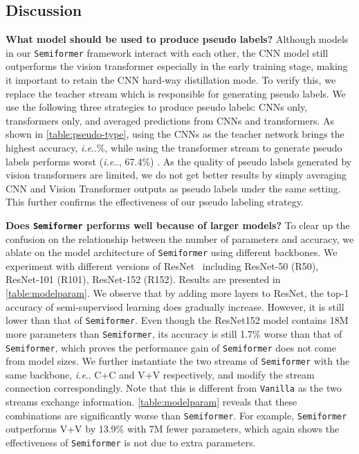 \documentclass[runningheads]{llncs}
\makeatletter
\DeclareRobustCommand\onedot{\futurelet\@let@token\@onedot}
\def\@onedot{\ifx\@let@token.\else.\null\fi\xspace}
\def\ie{\emph{i.e}\onedot} \def\Ie{\emph{I.e}\onedot}
\newcommand{\fakeparagraph}[1]{\textbf{#1}}
\newcommand*{\system}{\texttt{Semiformer}\@\xspace}
\newcommand*{\vanilla}{\texttt{Vanilla}\@\xspace}
\makeatother
\begin{document}
\subsection{Discussion}\label{sec:discussion}
\fakeparagraph{\bf What model should be used to produce pseudo labels?} Although models in our \system framework interact with each other, the CNN model still outperforms the vision transformer especially in the early training stage, making it important to retain the CNN hard-way distillation mode. To verify this, we replace the teacher stream which is responsible for generating pseudo labels. We use the following three strategies to produce pseudo labels: CNNs only, transformers only, and averaged predictions from CNNs and transformers. As shown in \cref{table:pseudo-type}, using the CNNs as the teacher network brings the highest accuracy, \ie 73.5\%, while using the transformer stream to generate pseudo labels performs worst (\ie, 67.4\%) .  As the quality of pseudo labels generated by vision transformers are limited, we do not get better results by simply averaging CNN and Vision Transformer outputs as pseudo labels under the same setting. This further confirms the effectiveness of our pseudo labeling strategy.





\fakeparagraph{\bf Does \system performs well because of larger models?} To clear up the confusion on the relationship between the number of parameters and  accuracy, we ablate on the model architecture of \system using different backbones. We experiment with different versions of ResNet~\cite{he2016deep} including ResNet-50 (R50), ResNet-101 (R101), ResNet-152 (R152). Results are presented in \cref{table:modelparam}. We observe that by adding more layers to ResNet, the top-1 accuracy of semi-supervised learning does gradually increase. However, it is still lower than that of \system. Even though the ResNet152 model contains 18M more parameters than \system, its accuracy is still 1.7\% worse than that of \system, which proves the performance gain of \system does not come from model sizes. We further instantiate the two streams of \system with the same backbone, \ie C+C and V+V respectively, and modify the stream connection correspondingly. Note that this is different from \vanilla as the two streams exchange information.  \cref{table:modelparam} reveals that these combinations are significantly worse than \system. For example, \system outperforms V+V by 13.9\% with 7M fewer parameters, which again shows the effectiveness of \system is not due to extra parameters.
\end{document}
